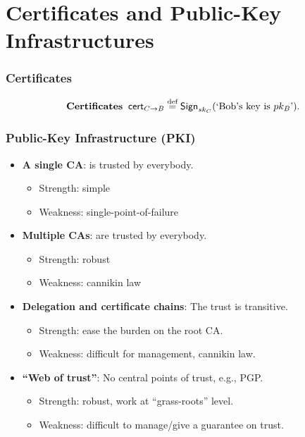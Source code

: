 \section{Certificates and Public-Key Infrastructures}
\begin{frame}\frametitle{Certificates}
\begin{figure}
\begin{center}

\end{center}
\end{figure}
\[\text{\bf Certificates}\;\; \mathsf{cert}_{C\to B} \overset{\text{def}}{=} \mathsf{Sign}_{sk_C}(\text{`Bob's key is } pk_B\text{'}).\]
\end{frame}
\begin{frame}\frametitle{Public-Key Infrastructure (PKI)}
\begin{itemize}
\item \textbf{A single CA}: is trusted by everybody.
\begin{itemize}
\item Strength: simple
\item Weakness: single-point-of-failure
\end{itemize}
\item \textbf{Multiple CAs}: are trusted by everybody.
\begin{itemize}
\item Strength: robust
\item Weakness: cannikin law
\end{itemize}
\item \textbf{Delegation and certificate chains}: The trust is transitive.
\begin{itemize}
\item Strength: ease the burden on the root CA. 
\item Weakness: difficult for management, cannikin law. 
\end{itemize}
\item \textbf{``Web of trust''}: No central points of trust, e.g., PGP.
\begin{itemize}
\item Strength: robust, work at ``grass-roots'' level. 
\item Weakness: difficult to manage/give a guarantee on trust.
\end{itemize}
\end{itemize}
\end{frame}

